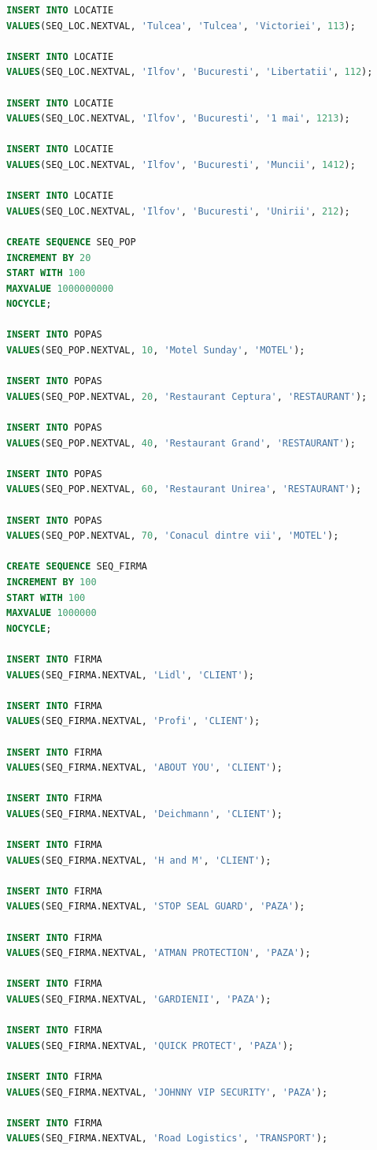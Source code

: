 \documentclass[12pt, a4paper]{article}
\begin{document}
\begin{lstlisting}[language=SQL]
INSERT INTO LOCATIE
VALUES(SEQ_LOC.NEXTVAL, 'Tulcea', 'Tulcea', 'Victoriei', 113);

INSERT INTO LOCATIE
VALUES(SEQ_LOC.NEXTVAL, 'Ilfov', 'Bucuresti', 'Libertatii', 112);

INSERT INTO LOCATIE
VALUES(SEQ_LOC.NEXTVAL, 'Ilfov', 'Bucuresti', '1 mai', 1213);

INSERT INTO LOCATIE
VALUES(SEQ_LOC.NEXTVAL, 'Ilfov', 'Bucuresti', 'Muncii', 1412);

INSERT INTO LOCATIE
VALUES(SEQ_LOC.NEXTVAL, 'Ilfov', 'Bucuresti', 'Unirii', 212);

CREATE SEQUENCE SEQ_POP
INCREMENT BY 20
START WITH 100
MAXVALUE 1000000000
NOCYCLE;

INSERT INTO POPAS
VALUES(SEQ_POP.NEXTVAL, 10, 'Motel Sunday', 'MOTEL');

INSERT INTO POPAS
VALUES(SEQ_POP.NEXTVAL, 20, 'Restaurant Ceptura', 'RESTAURANT');

INSERT INTO POPAS
VALUES(SEQ_POP.NEXTVAL, 40, 'Restaurant Grand', 'RESTAURANT');

INSERT INTO POPAS
VALUES(SEQ_POP.NEXTVAL, 60, 'Restaurant Unirea', 'RESTAURANT');

INSERT INTO POPAS
VALUES(SEQ_POP.NEXTVAL, 70, 'Conacul dintre vii', 'MOTEL');

CREATE SEQUENCE SEQ_FIRMA
INCREMENT BY 100
START WITH 100
MAXVALUE 1000000
NOCYCLE;

INSERT INTO FIRMA
VALUES(SEQ_FIRMA.NEXTVAL, 'Lidl', 'CLIENT');

INSERT INTO FIRMA
VALUES(SEQ_FIRMA.NEXTVAL, 'Profi', 'CLIENT');

INSERT INTO FIRMA
VALUES(SEQ_FIRMA.NEXTVAL, 'ABOUT YOU', 'CLIENT');

INSERT INTO FIRMA
VALUES(SEQ_FIRMA.NEXTVAL, 'Deichmann', 'CLIENT');

INSERT INTO FIRMA
VALUES(SEQ_FIRMA.NEXTVAL, 'H and M', 'CLIENT');

INSERT INTO FIRMA
VALUES(SEQ_FIRMA.NEXTVAL, 'STOP SEAL GUARD', 'PAZA');

INSERT INTO FIRMA
VALUES(SEQ_FIRMA.NEXTVAL, 'ATMAN PROTECTION', 'PAZA');

INSERT INTO FIRMA
VALUES(SEQ_FIRMA.NEXTVAL, 'GARDIENII', 'PAZA');

INSERT INTO FIRMA
VALUES(SEQ_FIRMA.NEXTVAL, 'QUICK PROTECT', 'PAZA');

INSERT INTO FIRMA
VALUES(SEQ_FIRMA.NEXTVAL, 'JOHNNY VIP SECURITY', 'PAZA');

INSERT INTO FIRMA
VALUES(SEQ_FIRMA.NEXTVAL, 'Road Logistics', 'TRANSPORT');


\end{lstlisting}
\end{document}
